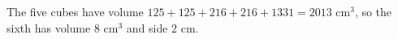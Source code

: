 The five cubes have volume $125+125+216+216+1331=2013$ cm$^3$, so the sixth has volume $8$ cm$^3$ and side $\boxed{2}$ cm.
